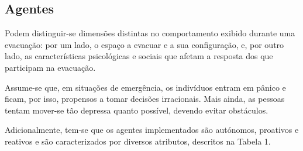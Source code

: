 \documentclass[12pt]{article}
\begin{document}
\begin{titlepage}
\subsection{Agentes}

Podem distinguir-se dimensões distintas no comportamento exibido durante uma evacuação: por um lado, o espaço a evacuar e a sua configuração, e, por outro lado, as características psicológicas e sociais que afetam a resposta dos que participam na evacuação.

Assume-se que, em situações de emergência, os indivíduos entram em pânico e ficam, por isso, propensos a tomar decisões irracionais. Mais ainda, as pessoas tentam mover-se tão depressa quanto possível, devendo evitar obstáculos.

Adicionalmente, tem-se que os agentes implementados são autónomos, proativos e reativos e são caracterizados por diversos atributos, descritos na Tabela 1.


\end{titlepage}
\end{document}
